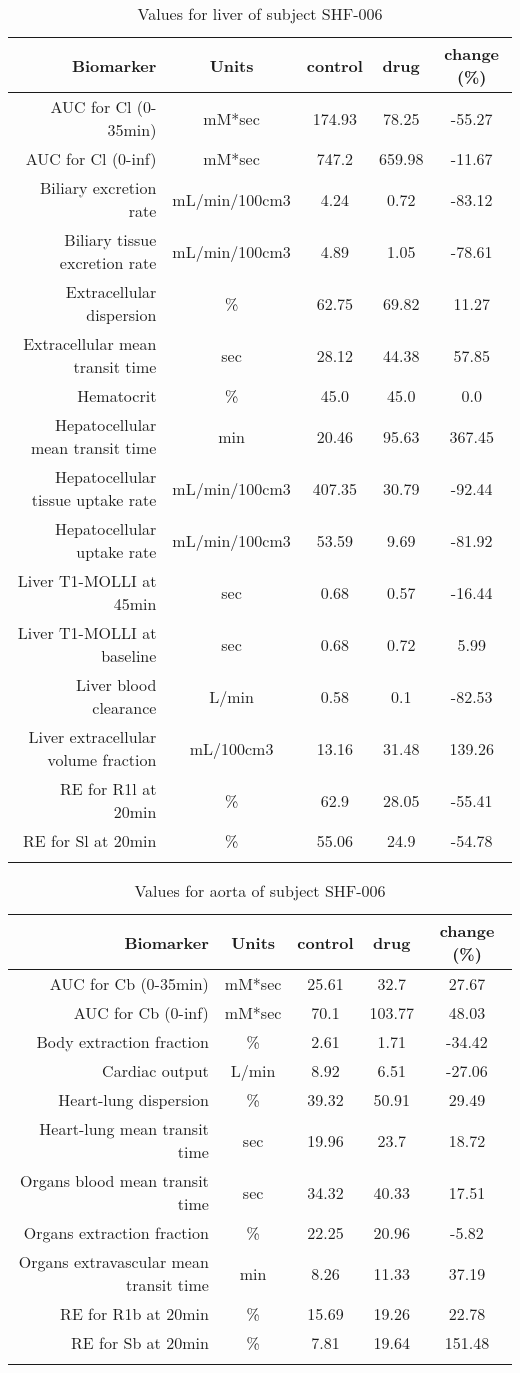 \documentclass{epflreport}%
\begin{document}
%
\clearpage%
\begin{longtable}{rcccc}%
\hline%
Biomarker&Units&control&drug&change (\%)\\%
\hline%
AUC for Cl (0{-}35min)&mM*sec&174.93&78.25&{-}55.27\\%
AUC for Cl (0{-}inf)&mM*sec&747.2&659.98&{-}11.67\\%
Biliary excretion rate&mL/min/100cm3&4.24&0.72&{-}83.12\\%
Biliary tissue excretion rate&mL/min/100cm3&4.89&1.05&{-}78.61\\%
Extracellular dispersion&\%&62.75&69.82&11.27\\%
Extracellular mean transit time&sec&28.12&44.38&57.85\\%
Hematocrit&\%&45.0&45.0&0.0\\%
Hepatocellular mean transit time&min&20.46&95.63&367.45\\%
Hepatocellular tissue uptake rate&mL/min/100cm3&407.35&30.79&{-}92.44\\%
Hepatocellular uptake rate&mL/min/100cm3&53.59&9.69&{-}81.92\\%
Liver T1{-}MOLLI at 45min&sec&0.68&0.57&{-}16.44\\%
Liver T1{-}MOLLI at baseline&sec&0.68&0.72&5.99\\%
Liver blood clearance&L/min&0.58&0.1&{-}82.53\\%
Liver extracellular volume fraction&mL/100cm3&13.16&31.48&139.26\\%
RE for R1l at 20min&\%&62.9&28.05&{-}55.41\\%
RE for Sl at 20min&\%&55.06&24.9&{-}54.78\\%
\hline%
\caption{Values for liver of subject SHF-006} \\%
\end{longtable}%
\begin{longtable}{rcccc}%
\hline%
Biomarker&Units&control&drug&change (\%)\\%
\hline%
AUC for Cb (0{-}35min)&mM*sec&25.61&32.7&27.67\\%
AUC for Cb (0{-}inf)&mM*sec&70.1&103.77&48.03\\%
Body extraction fraction&\%&2.61&1.71&{-}34.42\\%
Cardiac output&L/min&8.92&6.51&{-}27.06\\%
Heart{-}lung dispersion&\%&39.32&50.91&29.49\\%
Heart{-}lung mean transit time&sec&19.96&23.7&18.72\\%
Organs blood mean transit time&sec&34.32&40.33&17.51\\%
Organs extraction fraction&\%&22.25&20.96&{-}5.82\\%
Organs extravascular mean transit time&min&8.26&11.33&37.19\\%
RE for R1b at 20min&\%&15.69&19.26&22.78\\%
RE for Sb at 20min&\%&7.81&19.64&151.48\\%
\hline%
\caption{Values for aorta of subject SHF-006} \\%
\end{longtable}%
\clearpage%
\end{document}
